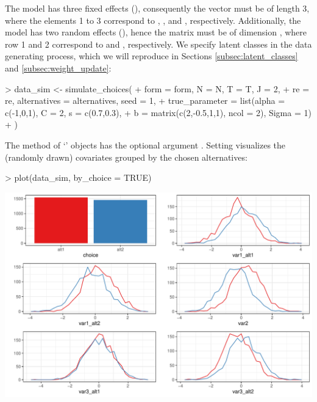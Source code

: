 \documentclass[article]{jss}
\newcommand{\class}[1]{`\code{#1}'}
\newcommand{\fct}[1]{\code{#1()}}
\begin{document}
The model has three fixed effects (), consequently the vector  must be of length 3, where the elements 1 to 3 correspond to , , and , respectively. Additionally, the model has two random effects (), hence the matrix  must be of dimension , where row 1 and 2 correspond to  and , respectively. We specify  latent classes in the data generating process, which we will reproduce in Sections \ref{subsec:latent_classes} and \ref{subsec:weight_update}:

\begin{Schunk}
\begin{Sinput}
> data_sim <- simulate_choices(
+    form = form, N = N, T = T, J = 2,
+    re = re, alternatives = alternatives, seed = 1,
+    true_parameter = list(alpha = c(-1,0,1), C = 2, s = c(0.7,0.3),
+                          b = matrix(c(2,-0.5,1,1), ncol = 2), Sigma = 1)
+  )
\end{Sinput}
\end{Schunk}

The \fct{plot} method of \class{RprobitB\_data} objects has the optional argument . Setting  visualizes the (randomly drawn) covariates grouped by the chosen alternatives:

\begin{Schunk}
\begin{Sinput}
> plot(data_sim, by_choice = TRUE)
\end{Sinput}
\end{Schunk}
\includegraphics{rprobitb_oelschlaeger_bauer-sim-data}
\end{document}
